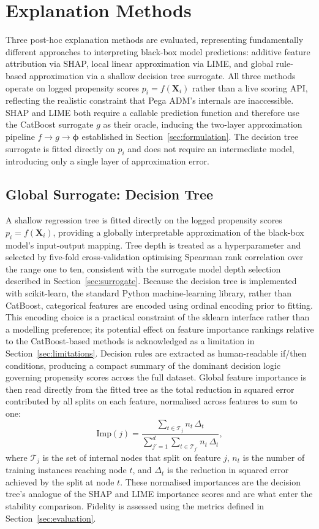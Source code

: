 \documentclass[oneside]{memoir} %
\begin{document}
\section{Explanation Methods} \label{sec:explanation_methods}

Three post-hoc explanation methods are evaluated, representing fundamentally different approaches to interpreting black-box model predictions: additive feature attribution via SHAP, local linear approximation via LIME, and global rule-based approximation via a shallow decision tree surrogate. All three methods operate on logged propensity scores $p_i = f(\mathbf{X}_i)$ rather than a live scoring API, reflecting the realistic constraint that Pega ADM's internals are inaccessible. SHAP and LIME both require a callable prediction function and therefore use the CatBoost surrogate $g$ as their oracle, inducing the two-layer approximation pipeline $f \rightarrow g \rightarrow \boldsymbol{\phi}$ established in Section~\ref{sec:formulation}. The decision tree surrogate is fitted directly on $p_i$ and does not require an intermediate model, introducing only a single layer of approximation error.

\subsection{Global Surrogate: Decision Tree}

A shallow regression tree is fitted directly on the logged propensity scores $p_i = f(\mathbf{X}_i)$, providing a globally interpretable approximation of the black-box model's input-output mapping. Tree depth is treated as a hyperparameter and selected by five-fold cross-validation optimising Spearman rank correlation over the range one to ten, consistent with the surrogate model depth selection described in Section~\ref{sec:surrogate}. Because the decision tree is implemented with scikit-learn, the standard Python machine-learning library, rather than CatBoost, categorical features are encoded using ordinal encoding prior to fitting. This encoding choice is a practical constraint of the sklearn interface rather than a modelling preference; its potential effect on feature importance rankings relative to the CatBoost-based methods is acknowledged as a limitation in Section~\ref{sec:limitations}. Decision rules are extracted as human-readable if/then conditions, producing a compact summary of the dominant decision logic governing propensity scores across the full dataset. Global feature importance is then read directly from the fitted tree as the total reduction in squared error contributed by all splits on each feature, normalised across features to sum to one:
\[
\mathrm{Imp}(j) = \frac{\sum_{t \in \mathcal{T}_j} n_t\,\Delta_t}{\sum_{j'=1}^{d}\sum_{t \in \mathcal{T}_{j'}} n_t\,\Delta_t},
\]
where $\mathcal{T}_j$ is the set of internal nodes that split on feature $j$, $n_t$ is the number of training instances reaching node $t$, and $\Delta_t$ is the reduction in squared error achieved by the split at node $t$. These normalised importances are the decision tree's analogue of the SHAP and LIME importance scores and are what enter the stability comparison. Fidelity is assessed using the metrics defined in Section~\ref{sec:evaluation}.
\end{document}

